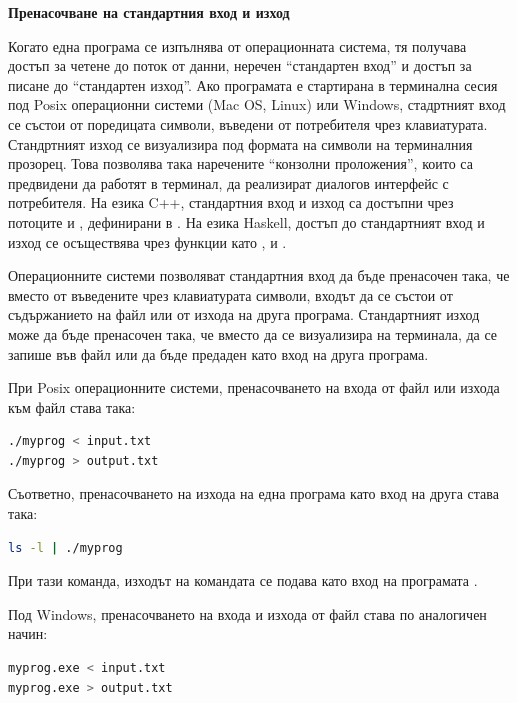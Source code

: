 \begin{mdframed}[hidealllines=true,backgroundcolor=gray!20]
\textbf{Пренасочване на стандартния вход и изход}

Когато една програма се изпълнява от операционната система, тя получава достъп за четене до поток от данни, неречен ``стандартен вход'' и достъп за писане до ``стандартен изход''. Ако програмата е стартирана в терминална сесия под Posix операционни системи (Mac OS, Linux) или Windows, стадртният вход се състои от поредицата символи, въведени от потребителя чрез клавиатурата. Стандртният изход се визуализира под формата на символи на терминалния прозорец. Това позволява така наречените ``конзолни проложения'', които са предвидени да работят в терминал, да реализират диалогов интерфейс с потребителя. На езика C++, стандартния вход и изход са достъпни чрез потоците  и , дефинирани в . На езика Haskell, достъп до стандартният вход и изход се осъществява чрез функции като ,  и .

Операционните системи позволяват стандартния вход да бъде пренасочен така, че вместо от въведените чрез клавиатурата символи, входът да се състои от съдържанието на файл или от изхода на друга програма. Стандартният изход може да бъде пренасочен така, че вместо да се визуализира на терминала, да се запише във файл или да бъде предаден като вход на друга програма.

При Posix операционните системи, пренасочването на входа от файл или изхода към файл става така: 
\begin{lstlisting}[basicstyle=\small,language=bash]
./myprog < input.txt
./myprog > output.txt
\end{lstlisting}

Съответно, пренасочването на изхода на една програма като вход на друга става така:
\begin{lstlisting}[basicstyle=\small,language=bash]
ls -l | ./myprog
\end{lstlisting}
При тази команда, изходът на командата  се подава като вход на програмата .

Под Windows, пренасочването на входа и изхода от файл става по аналогичен начин:
\begin{lstlisting}[basicstyle=\small,language=bash]
myprog.exe < input.txt
myprog.exe > output.txt
\end{lstlisting}
\end{mdframed}

